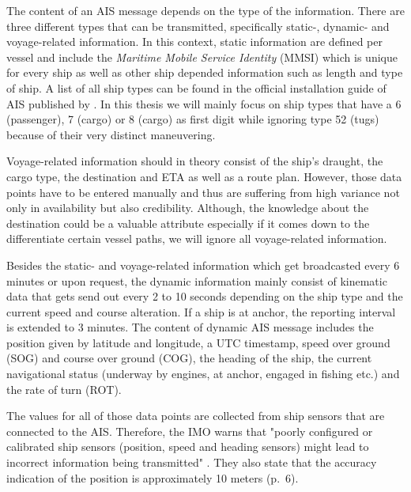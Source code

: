The content of an AIS message depends on the type of the information. There are three different types that can be transmitted, specifically static-, dynamic- and voyage-related information. In this context, static information are defined per vessel and include the \textit{Maritime Mobile Service Identity} (MMSI) which is unique for every ship as well as other ship depended information such as length and type of ship. A list of all ship types can be found in the official installation guide of AIS published by \cite{imo2}. In this thesis we will mainly focus on ship types that have a 6 (passenger), 7 (cargo) or 8 (cargo) as first digit while ignoring type 52 (tugs) because of their very distinct maneuvering.
\par
Voyage-related information should in theory consist of the ship's draught, the cargo type, the destination and ETA as well as a route plan. However, those data points have to be entered manually and thus are suffering from high variance not only in availability but also credibility. Although, the knowledge about the destination could be a valuable attribute especially if it comes down to the differentiate certain vessel paths, we will ignore all voyage-related information.
\par
Besides the static- and voyage-related information which get broadcasted every 6 minutes or upon request, the dynamic information mainly consist of kinematic data that gets send out every 2 to 10 seconds depending on the ship type and the current speed and course alteration. If a ship is at anchor, the reporting interval is extended to 3 minutes. The content of dynamic AIS message includes the position given by latitude and longitude, a UTC timestamp, speed over ground (SOG) and course over ground (COG), the heading of the ship, the current navigational status (underway by engines, at anchor, engaged in fishing etc.) and the rate of turn (ROT). 
\par
The values for all of those data points are collected from ship sensors that are connected to the AIS. Therefore, the IMO warns that "poorly configured or calibrated ship sensors (position,
speed and heading sensors) might lead to incorrect information being transmitted" \cite[p.~11]{international2015revised}. They also state that the accuracy indication of the position is approximately 10 meters (p.~6).